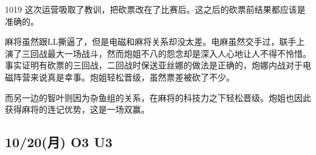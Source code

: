 
1019 这次运营吸取了教训，把砍票改在了比赛后。这之后的砍票前结果都应该是准确的。

麻将虽然跟LL撕逼了，但是电磁和麻将关系却没太差。电麻虽然交手过，联手上演了三回战最大一场战斗，然而炮姐不八的怨念却是深入人心地让人不得不怜惜。事实证明有砍票的三回战，二回战时保送亚丝娜的做法是正确的，炮娜内战对于电磁阵营来说真是幸事。炮姐轻松晋级，虽然票差被砍了不少。

而另一边的智叶则因为杂鱼组的关系，在麻将的科技力之下轻松晋级。炮姐也因此获得麻将的连记优势，这是一场双赢。

\subsection{10/20(月) O3 U3}

